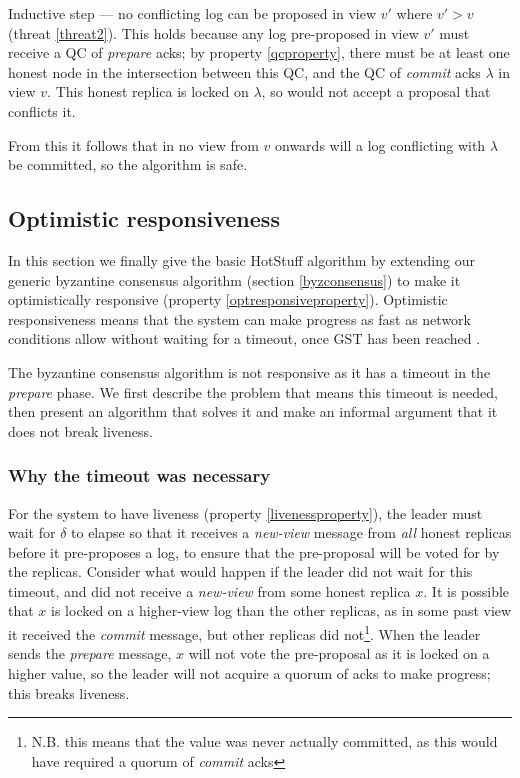 Inductive step --- no conflicting log can be proposed in view $v'$ where $v' > v$ (threat \ref{threat2}). This holds because any log pre-proposed in view $v'$ must receive a QC of \textit{prepare} acks; by property \ref{qcproperty}, there must be at least one honest node in the intersection between this QC, and the QC of \textit{commit} acks $\lambda$ in view $v$. This honest replica is locked on $\lambda$, so would not accept a proposal that conflicts it.

From this it follows that in no view from $v$ onwards will a log conflicting with $\lambda$ be committed, so the algorithm is safe.

\subsection{Optimistic responsiveness} \label{optresponsive}
In this section we finally give the basic HotStuff algorithm by extending our generic byzantine consensus algorithm (section \ref{byzconsensus}) to make it optimistically responsive (property \ref{optresponsiveproperty}). Optimistic responsiveness means that the system can make progress as fast as network conditions allow without waiting for a timeout, once GST has been reached \cite{passThunderellaBlockchainsOptimistic2018}.

The byzantine consensus algorithm is not responsive as it has a timeout in the \textit{prepare} phase. We first describe the problem that means this timeout is needed, then present an algorithm that solves it and make an informal argument that it does not break liveness.

\subsubsection{Why the timeout was necessary}
For the system to have liveness (property \ref{livenessproperty}), the leader must wait for $\delta$ to elapse so that it receives a \textit{new-view} message from \textit{all} honest replicas before it pre-proposes a log, to ensure that the pre-proposal will be voted for by the replicas. Consider what would happen if the leader did not wait for this timeout, and did not receive a \textit{new-view} from some honest replica $x$. It is possible that $x$ is locked on a higher-view log than the other replicas, as in some past view it received the \textit{commit} message, but other replicas did not\footnote{N.B. this means that the value was never actually committed, as this would have required a quorum of \textit{commit} acks}. When the leader sends the \textit{prepare} message, $x$ will not vote the pre-proposal as it is locked on a higher value, so the leader will not acquire a quorum of acks to make progress; this breaks liveness.

